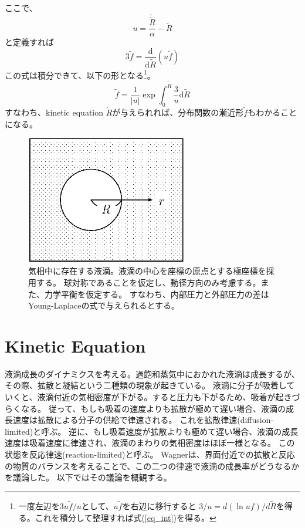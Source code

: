\documentclass{jarticle}
\newcommand{\diff}{{\mathrm d}}
\begin{document}
ここで、
\begin{equation}
    u = \frac{\tilde{\dot{R}}}{\alpha } - \tilde{R}
\end{equation}
と定義すれば
\begin{equation}
    3 \tilde{f} = \frac{\diff }{\diff \tilde{R}} (u \tilde{f})
\end{equation}
この式は積分できて、以下の形となる\footnote{一度左辺を$3 u\tilde{f}/u$として、$u\tilde{f}$を右辺に移行すると
    $3/u = d (\ln uf)/ d \tilde{R}$を得る。これを積分して整理すれば式(\ref{eq_int})を得る。
}。
\begin{equation}
    \tilde{f} = \frac{1}{|u|} \exp \int_0^{\tilde{R}} \frac{3}{u} \diff \tilde{R} \label{eq_int}
\end{equation}
すなわち、kinetic equation $\dot{R}$が与えられれば、分布関数の漸近形$\tilde{f}$もわかることになる。

\begin{figure}[tbh]
    \begin{center}
        \includegraphics[width=7cm]{droplet.eps}
    \end{center}
    \caption{
        気相中に存在する液滴。液滴の中心を座標の原点とする極座標を採用する。
        球対称であることを仮定し、動径方向のみ考慮する。また、力学平衡を仮定する。
        すなわち、内部圧力と外部圧力の差はYoung-Laplaceの式で与えられるとする。
    }
\end{figure}
\section{Kinetic Equation}

液滴成長のダイナミクスを考える。過飽和蒸気中におかれた液滴は成長するが、その際、拡散と凝結という二種類の現象が起きている。
液滴に分子が吸着していくと、液滴付近の気相密度が下がる。すると圧力も下がるため、吸着が起きづらくなる。
従って、もしも吸着の速度よりも拡散が極めて遅い場合、液滴の成長速度は拡散による分子の供給で律速される。
これを拡散律速(diffusion-limited)と呼ぶ。
逆に、もし吸着速度が拡散よりも極めて遅い場合、液滴の成長速度は吸着速度に律速され、液滴のまわりの気相密度はほぼ一様となる。
この状態を反応律速(reaction-limited)と呼ぶ。
Wagnerは、界面付近での拡散と反応の物質のバランスを考えることで、この二つの律速で液滴の成長率がどうなるかを議論した。
以下ではその議論を概観する。
\end{document}
